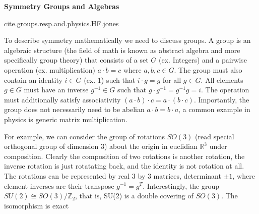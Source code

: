 \textbf{Symmetry Groups and Algebras}

cite.groups.resp.and.physics.HF.jones

To describe symmetry mathematically we need to discuss groups. A group
is an algebraic structure (the field of math is known as abstract algebra and more specifically group theory) that 
consists of a set $G$ (ex. Integers) and a pairwise operation (ex. multiplication) $a\cdot b = c$ where $a,b, c\in G$.
The group must also contain an identity $i \in G$ (ex. 1) such that $i\cdot g = g$ for all $g\in G$. All elements 
$g\in G$ must have an inverse $g^{-1} \in G$ such that $g \cdot g^{-1} = g^{-1} g = i$. The operation must additionally
satisfy associativity $(a\cdot b) \cdot c = a \cdot (b \cdot c)$. Importantly, the group does not necessarily 
need to be abelian $a\cdot b = b \cdot a$, a common example in physics is generic matrix multiplication.

For example, we can consider the group of rotations $SO(3)$ (read special orthogonal group of
dimension 3) about the origin in euclidian $\mathbb{R}^3$ under composition. Clearly the composition
of two rotations is another rotation, the inverse rotation is just rotatating back, and the identity is
not rotation at all. The rotations can be represented by real 3 by 3 matrices, determinant $\pm 1$, 
where element inverses are their transpose $g^{-1}=g^T$. Interestingly, the group $SU(2) \cong SO(3) / \mathbb{Z}_2$, that is, 
SU(2) is a double covering of $SO(3)$. The isomorphism is exact 


